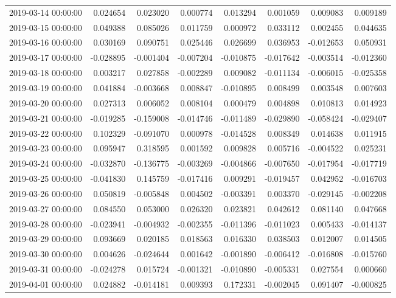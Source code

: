 \begin{tabular}{lrrrrrrr}
2019-03-14 00:00:00 & 0.024654 & 0.023020 & 0.000774 & 0.013294 & 0.001059 & 0.009083 & 0.009189 \\
2019-03-15 00:00:00 & 0.049388 & 0.085026 & 0.011759 & 0.000972 & 0.033112 & 0.002455 & 0.044635 \\
2019-03-16 00:00:00 & 0.030169 & 0.090751 & 0.025446 & 0.026699 & 0.036953 & -0.012653 & 0.050931 \\
2019-03-17 00:00:00 & -0.028895 & -0.001404 & -0.007204 & -0.010875 & -0.017642 & -0.003514 & -0.012360 \\
2019-03-18 00:00:00 & 0.003217 & 0.027858 & -0.002289 & 0.009082 & -0.011134 & -0.006015 & -0.025358 \\
2019-03-19 00:00:00 & 0.041884 & -0.003668 & 0.008847 & -0.010895 & 0.008499 & 0.003548 & 0.007603 \\
2019-03-20 00:00:00 & 0.027313 & 0.006052 & 0.008104 & 0.000479 & 0.004898 & 0.010813 & 0.014923 \\
2019-03-21 00:00:00 & -0.019285 & -0.159008 & -0.014746 & -0.011489 & -0.029890 & -0.058424 & -0.029407 \\
2019-03-22 00:00:00 & 0.102329 & -0.091070 & 0.000978 & -0.014528 & 0.008349 & 0.014638 & 0.011915 \\
2019-03-23 00:00:00 & 0.095947 & 0.318595 & 0.001592 & 0.009828 & 0.005716 & -0.004522 & 0.025231 \\
2019-03-24 00:00:00 & -0.032870 & -0.136775 & -0.003269 & -0.004866 & -0.007650 & -0.017954 & -0.017719 \\
2019-03-25 00:00:00 & -0.041830 & 0.145759 & -0.017416 & 0.009291 & -0.019457 & 0.042952 & -0.016703 \\
2019-03-26 00:00:00 & 0.050819 & -0.005848 & 0.004502 & -0.003391 & 0.003370 & -0.029145 & -0.002208 \\
2019-03-27 00:00:00 & 0.084550 & 0.053000 & 0.026320 & 0.023821 & 0.042612 & 0.081140 & 0.047668 \\
2019-03-28 00:00:00 & -0.023941 & -0.004932 & -0.002355 & -0.011396 & -0.011023 & 0.005433 & -0.014137 \\
2019-03-29 00:00:00 & 0.093669 & 0.020185 & 0.018563 & 0.016330 & 0.038503 & 0.012007 & 0.014505 \\
2019-03-30 00:00:00 & 0.004626 & -0.024644 & 0.001642 & -0.001890 & -0.006412 & -0.016808 & -0.015760 \\
2019-03-31 00:00:00 & -0.024278 & 0.015724 & -0.001321 & -0.010890 & -0.005331 & 0.027554 & 0.000660 \\
2019-04-01 00:00:00 & 0.024882 & -0.014181 & 0.009393 & 0.172331 & -0.002045 & 0.091407 & -0.000825 \\

\end{tabular}
